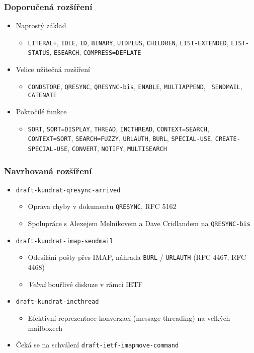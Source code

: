 \documentclass{beamer}
\begin{document}
\begin{frame}[fragile]
  \frametitle{Doporučená rozšíření}
  \begin{itemize}
    \item Naprostý základ
      \begin{itemize}
        \item {\tt LITERAL+}, {\tt IDLE}, {\tt ID}, {\tt BINARY}, {\tt UIDPLUS}, {\tt CHILDREN}, {\tt LIST-EXTENDED},
          {\tt LIST-STATUS}, {\tt ESEARCH}, {\tt COMPRESS=DEFLATE}
      \end{itemize}
    \item Velice užitečná rozšíření
      \begin{itemize}
        \item {\tt CONDSTORE}, {\tt QRESYNC}, {\tt \alert<2->{QRESYNC-bis}}, {\tt ENABLE}, {\tt MULTIAPPEND}, {\tt
          \alert<2->{SENDMAIL}}, {\tt CATENATE}
      \end{itemize}
    \item Pokročilé funkce
      \begin{itemize}
        \item {\tt SORT}, {\tt SORT=DISPLAY}, {\tt THREAD}, {\tt \alert<2->{INCTHREAD}}, {\tt CONTEXT=SEARCH}, {\tt
          CONTEXT=SORT}, {\tt SEARCH=FUZZY}, {\tt URLAUTH}, {\tt BURL}, {\tt SPECIAL-USE}, {\tt CREATE-SPECIAL-USE},
          {\tt CONVERT}, {\tt NOTIFY}, {\tt MULTISEARCH}
      \end{itemize}
  \end{itemize}
\end{frame}

\begin{frame}[fragile]
  \frametitle{Navrhovaná rozšíření}
  \begin{itemize}
    \item {\tt draft-kundrat-qresync-arrived}
      \begin{itemize}
        \item Oprava chyby v dokumentu {\tt QRESYNC}, RFC 5162
        \item Spolupráce s Alexejem Melnikovem a Dave Cridlandem na {\tt QRESYNC-bis}
      \end{itemize}
    \item {\tt draft-kundrat-imap-sendmail}
      \begin{itemize}
        \item Odesílání pošty přes IMAP, náhrada {\tt BURL} / {\tt URLAUTH} (RFC 4467, RFC 4468)
        \item {\em Velmi} bouřlivé diskuze v rámci IETF
      \end{itemize}
    \item {\tt draft-kundrat-incthread}
      \begin{itemize}
        \item Efektivní reprezentace konverzací (message threading) na velkých mailboxech
      \end{itemize}
    \item Čeká se na schválení {\tt draft-ietf-imapmove-command}
  \end{itemize}
\end{frame}
\end{document}
